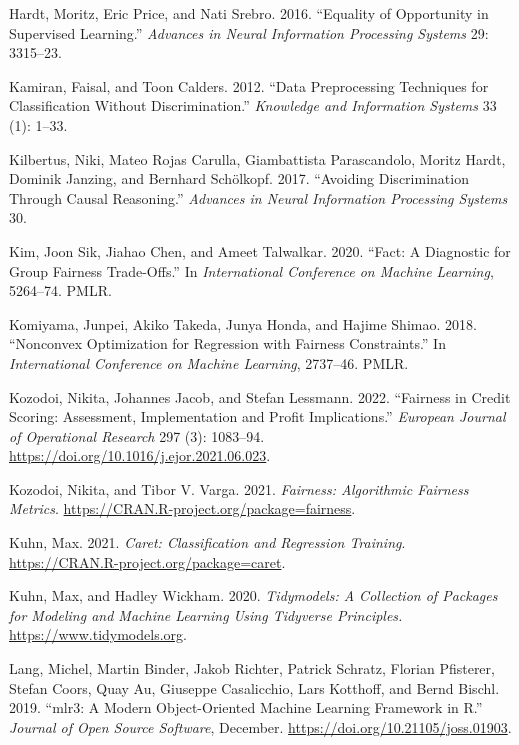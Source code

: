 \begin{CSLReferences}{1}{0}
\leavevmode{}%
Hardt, Moritz, Eric Price, and Nati Srebro. 2016. {``Equality of Opportunity in Supervised Learning.''} \emph{Advances in Neural Information Processing Systems} 29: 3315--23.

\leavevmode{}%
Kamiran, Faisal, and Toon Calders. 2012. {``Data Preprocessing Techniques for Classification Without Discrimination.''} \emph{Knowledge and Information Systems} 33 (1): 1--33.

\leavevmode{}%
Kilbertus, Niki, Mateo Rojas Carulla, Giambattista Parascandolo, Moritz Hardt, Dominik Janzing, and Bernhard Schölkopf. 2017. {``Avoiding Discrimination Through Causal Reasoning.''} \emph{Advances in Neural Information Processing Systems} 30.

\leavevmode{}%
Kim, Joon Sik, Jiahao Chen, and Ameet Talwalkar. 2020. {``Fact: A Diagnostic for Group Fairness Trade-Offs.''} In \emph{International Conference on Machine Learning}, 5264--74. PMLR.

\leavevmode{}%
Komiyama, Junpei, Akiko Takeda, Junya Honda, and Hajime Shimao. 2018. {``Nonconvex Optimization for Regression with Fairness Constraints.''} In \emph{International Conference on Machine Learning}, 2737--46. PMLR.

\leavevmode{}%
Kozodoi, Nikita, Johannes Jacob, and Stefan Lessmann. 2022. {``Fairness in Credit Scoring: Assessment, Implementation and Profit Implications.''} \emph{European Journal of Operational Research} 297 (3): 1083--94. \url{https://doi.org/10.1016/j.ejor.2021.06.023}.

\leavevmode{}%
Kozodoi, Nikita, and Tibor V. Varga. 2021. \emph{Fairness: Algorithmic Fairness Metrics}. \url{https://CRAN.R-project.org/package=fairness}.

\leavevmode{}%
Kuhn, Max. 2021. \emph{Caret: Classification and Regression Training}. \url{https://CRAN.R-project.org/package=caret}.

\leavevmode{}%
Kuhn, Max, and Hadley Wickham. 2020. \emph{Tidymodels: A Collection of Packages for Modeling and Machine Learning Using Tidyverse Principles.} \url{https://www.tidymodels.org}.

\leavevmode{}%
Lang, Michel, Martin Binder, Jakob Richter, Patrick Schratz, Florian Pfisterer, Stefan Coors, Quay Au, Giuseppe Casalicchio, Lars Kotthoff, and Bernd Bischl. 2019. {``{mlr3}: A Modern Object-Oriented Machine Learning Framework in {R}.''} \emph{Journal of Open Source Software}, December. \url{https://doi.org/10.21105/joss.01903}.


\end{CSLReferences}
